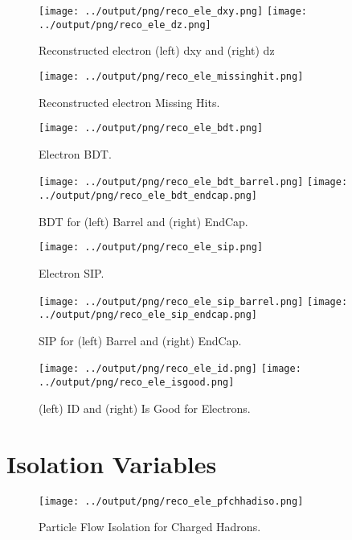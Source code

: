 \documentclass[11pt]{book}
\begin{document}
\begin{figure}[htb]
\centering
\texttt{[image: ../output/png/reco\_ele\_dxy.png]}
\texttt{[image: ../output/png/reco\_ele\_dz.png]}
\caption{Reconstructed electron (left) dxy and (right) dz}
\label{fig:reco_ele_dxy_dz}
\end{figure}

\begin{figure}[htb]
\centering
\texttt{[image: ../output/png/reco\_ele\_missinghit.png]}
\caption{Reconstructed electron Missing Hits.}
\label{fig:reco_ele_missinghit}
\end{figure}

\begin{figure}[htb]
\centering
\texttt{[image: ../output/png/reco\_ele\_bdt.png]}
\caption{Electron BDT.}
\label{fig:reco_ele_bdt}
\end{figure}

\begin{figure}[htb]
\centering
\texttt{[image: ../output/png/reco\_ele\_bdt\_barrel.png]}
\texttt{[image: ../output/png/reco\_ele\_bdt\_endcap.png]}
\caption{BDT for (left) Barrel and (right) EndCap.}
\label{fig:reco_ele_bdt_regions}
\end{figure}

\begin{figure}[htb]
\centering
\texttt{[image: ../output/png/reco\_ele\_sip.png]}
\caption{Electron SIP.}
\label{fig:reco_ele_sip}
\end{figure}

\begin{figure}[htb]
\centering
\texttt{[image: ../output/png/reco\_ele\_sip\_barrel.png]}
\texttt{[image: ../output/png/reco\_ele\_sip\_endcap.png]}
\caption{SIP for (left) Barrel and (right) EndCap.}
\label{fig:reco_ele_sip_regions}
\end{figure}

\begin{figure}[htb]
\centering
\texttt{[image: ../output/png/reco\_ele\_id.png]}
\texttt{[image: ../output/png/reco\_ele\_isgood.png]}
\caption{(left) ID and (right) Is Good for Electrons.}
\label{fig:reco_ele_id_isgood}
\end{figure}
\clearpage

\section{Isolation Variables}
\begin{figure}[htb]
\centering
\texttt{[image: ../output/png/reco\_ele\_pfchhadiso.png]}
\caption{Particle Flow Isolation for Charged Hadrons.}
\label{fig:reco_ele_pfchhadiso}
\end{figure}
\end{document}
